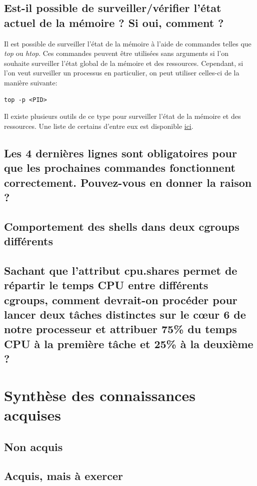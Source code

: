 \documentclass{ReportTemplate}
\begin{document}
\subsection{Est-il possible de surveiller/vérifier l’état actuel de la mémoire ? Si oui, comment ?}
Il est possible de surveiller l'état de la mémoire à l'aide de commandes telles
que \textit{top} ou \textit{htop}. Ces commandes peuvent être utilisées sans
arguments si l'on souhaite surveiller l'état global de la mémoire et des
ressources. Cependant, si l'on veut surveiller un processus en particulier, on
peut utiliser celles-ci de la manière suivante:
\begin{verbatim}
top -p <PID>
\end{verbatim}
Il existe plusieurs outils de ce type pour surveiller l'état de la mémoire et
des ressources. Une liste de certains d'entre eux est disponible \href{https://geekflare.com/fr/process-cpu-memory-monitoring/}{ici}.
\subsection{Les 4 dernières lignes sont obligatoires pour que les prochaines commandes fonctionnent correctement. Pouvez-vous en donner la raison ?}

\subsection{Comportement des shells dans deux cgroups différents}

\subsection{Sachant que l’attribut cpu.shares permet de répartir le temps CPU entre différents cgroups, comment devrait-on procéder pour lancer deux tâches distinctes sur le cœur 6 de notre processeur et attribuer 75\% du temps CPU à la première tâche et 25\% à la deuxième ?}

\section{Synthèse des connaissances acquises}
\subsection{Non acquis}

\subsection{Acquis, mais à exercer}
\end{document}
